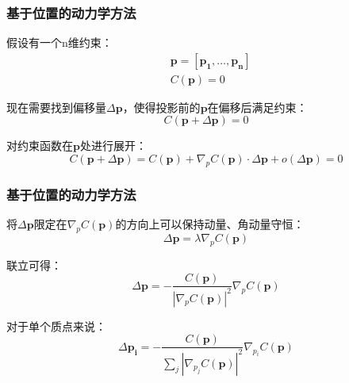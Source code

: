 \documentclass[aspectratio=43]{ctexbeamer}
\begin{document}
\begin{frame}
  \frametitle{基于位置的动力学方法}
		假设有一个n维约束：
		\begin{equation}
		\begin{split}
			&\pmb{p} = [\pmb{p_1},…,\pmb{p_n}]\\
			&C(\pmb{p}) = 0
		\end{split}
		\end{equation}

		现在需要找到偏移量$\Delta \pmb{p}$，使得投影前的$\pmb{p}$在偏移后满足约束：
        \begin{equation}
			C(\pmb{p}+\Delta \pmb{p})=0
        \end{equation}

		对约束函数在$\pmb{p}$处进行展开：
        \begin{equation}
			C(\pmb{p}+\Delta \pmb{p}) = C(\pmb{p}) + \nabla_pC(\pmb{p}) \cdot \Delta \pmb{p} +o(\Delta \pmb{p}) =0
        \end{equation}
\end{frame}

\begin{frame}
  \frametitle{基于位置的动力学方法}
		将$\Delta \pmb{p}$限定在$\nabla_pC(\pmb{p})$的方向上可以保持动量、角动量守恒：
        \begin{equation}
			\Delta \pmb{p} = \lambda \nabla_pC(\pmb{p})
        \end{equation}

		联立可得：
        \begin{equation}
			\Delta \pmb{p} = -\frac{C(\pmb{p})}{\left | \nabla_pC(\pmb{p}) \right | ^2}\nabla_pC(\pmb{p})
        \end{equation}

		对于单个质点来说：
        \begin{equation}
		\Delta \pmb{p_i} = -\frac{C(\pmb{p})}{\sum_{j} \left | \nabla_{p_j}C(\pmb{p}) \right | ^2}\nabla_{p_i}C(\pmb{p})
        \end{equation}
\end{frame}
\end{document}
